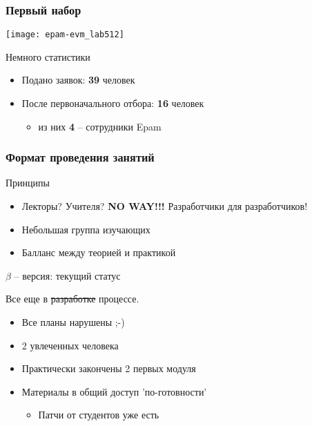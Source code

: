 \begin{frame}
	\frametitle{Первый набор}

	\center\texttt{[image: epam-evm\_lab512]}

	\begin{block}{Немного статистики}
		\begin{itemize}
			\item Подано заявок: {\bf 39} человек
			\item После первоначального отбора: {\bf 16} человек
				\begin{itemize}
					\item из них {\bf 4} -- сотрудники Epam
				\end{itemize}
		\end{itemize}
	\end{block}
\end{frame}

\begin{frame}
	\frametitle{Формат проведения занятий}

	\begin{block}{Принципы}
		\begin{itemize}
			\item Лекторы? Учителя? {\bf NO WAY!!!} \newline 
				Разработчики для разработчиков! 
			\item Небольшая группа изучающих
			\item Балланс между теорией и практикой
		\end{itemize}
	\end{block}

	\pause

	\begin{block}{ $\beta$ -- версия: текущий статус}

		Все еще в \sout{разработке} процессе.

		\begin{itemize}
			\item Все планы нарушены ;-)
			\item 2 увлеченных человека
			\item Практически закончены 2 первых модуля
			\item Материалы в общий доступ 'по-готовности'
				\begin{itemize}
					\item Патчи от студентов уже есть
				\end{itemize}
		\end{itemize}
	\end{block}

\end{frame}



